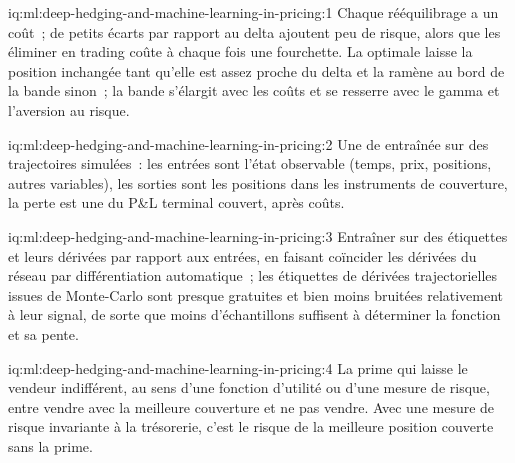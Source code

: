 \begin{solution}{iq:ml:deep-hedging-and-machine-learning-in-pricing:1}
Chaque rééquilibrage a un coût~; de petits écarts par rapport au delta ajoutent peu de risque, alors que les éliminer en trading coûte à chaque fois une fourchette. La
 optimale laisse la position inchangée tant qu'elle est assez proche du delta et la ramène au bord de la bande sinon~; la
bande s'élargit avec les coûts et se resserre avec le gamma et l'aversion au risque.
\end{solution}

\begin{solution}{iq:ml:deep-hedging-and-machine-learning-in-pricing:2}
Une  de  entraînée sur des trajectoires simulées~: les entrées sont l'état observable (temps, prix, positions, autres variables), les sorties sont
les positions dans les instruments de couverture, la perte est une  du P\&L terminal couvert, après coûts.
\end{solution}

\begin{solution}{iq:ml:deep-hedging-and-machine-learning-in-pricing:3}
Entraîner sur des étiquettes et leurs dérivées par rapport aux entrées, en faisant coïncider les dérivées du réseau par
différentiation automatique~; les étiquettes de dérivées trajectorielles issues de Monte-Carlo sont presque gratuites et bien moins bruitées relativement à leur signal, de sorte que
moins d'échantillons suffisent à déterminer la fonction et sa pente.
\end{solution}

\begin{solution}{iq:ml:deep-hedging-and-machine-learning-in-pricing:4}
La prime qui laisse le vendeur indifférent, au sens d'une fonction d'utilité ou d'une mesure de risque, entre vendre avec la meilleure couverture et ne pas
vendre. Avec une mesure de risque invariante à la trésorerie, c'est le risque de la meilleure position couverte sans la prime.
\end{solution}

